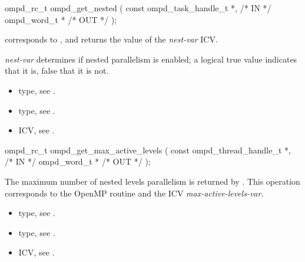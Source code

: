 \summary

\format
\cspecificstart
\begin{boxedcode}
ompd\_rc\_t ompd\_get\_nested (
  const ompd\_task\_handle\_t  *,                           /* IN */
  ompd\_word\_t              *                                   /* OUT */
);
\end{boxedcode}
\cspecificend

\descr
{} corresponds to ,
and returns the value of the \emph{nest-var} ICV.

\argdesc
\emph{nest-var} determines if nested parallelism is enabled;
a logical true value indicates that it is, false that it is not.

\crossreferences
\begin{itemize}
	\item {} type, see .
	\item {} type, see .
	\item {} ICV, see .
\end{itemize}


\summary

\format
\cspecificstart
\begin{boxedcode}
ompd\_rc\_t ompd\_get\_max\_active\_levels (
  const ompd\_thread\_handle\_t  *,                       /* IN */
  ompd\_word\_t                *                                 /* OUT */
);
\end{boxedcode}
\cspecificend

\descr
The maximum number of nested levels parallelism is returned by
.
This operation corresponds to the OpenMP routine
and the ICV \emph{max-active-levels-var}.%

\argdesc

\crossreferences
\begin{itemize}
	\item {} type, see .
	\item {} type, see .
	\item {} ICV, see .
\end{itemize}


